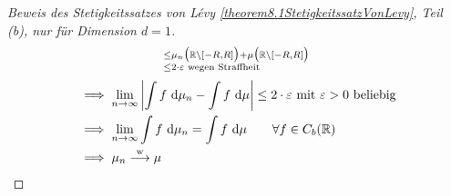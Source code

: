 \begin{proof}[Beweis des Stetigkeitssatzes von Lévy \ref{theorem8.1StetigkeitssatzVonLevy}, Teil (b), nur für Dimension $d=1$]
\begin{align*}
{			\begin{subarray}{l}
				\leq\mu_n\big(\mathbb{R}\setminus[-R,R]\big)+\mu\big(\mathbb{R}\setminus[-R,R]\big)\\
				\leq 2\cdot\varepsilon\text{ wegen Straffheit}
			\end{subarray}
		}
	\end{align*}
	\begin{align*}
		&\implies\lim\limits_{n\to\infty}\left|\int\limits f\text{ d}\mu_n-\int\limits f\text{ d}\mu\right|\leq 2\cdot\varepsilon \text{ mit } \varepsilon>0 \text{ beliebig}\\
		&\implies\lim\limits_{n\to\infty}\int\limits f\text{ d}\mu_n=\int\limits f\text{ d}\mu\qquad\forall f\in C_b(\mathbb{R})\\
		&\implies\mu_n\overset{\text{w}}{\longrightarrow}\mu
	\end{align*}
\end{proof}

